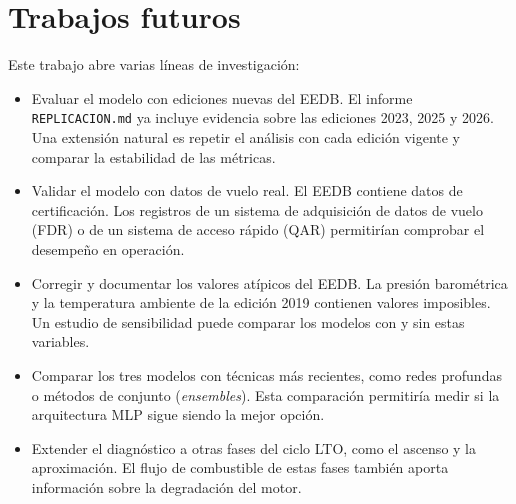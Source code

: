 \chapter{Trabajos futuros}

Este trabajo abre varias líneas de investigación:

\begin{itemize}
    \item Evaluar el modelo con ediciones nuevas del EEDB. El informe \texttt{REPLICACION.md} ya incluye evidencia sobre las ediciones 2023, 2025 y 2026. Una extensión natural es repetir el análisis con cada edición vigente y comparar la estabilidad de las métricas.
    \item Validar el modelo con datos de vuelo real. El EEDB contiene datos de certificación. Los registros de un sistema de adquisición de datos de vuelo (FDR) o de un sistema de acceso rápido (QAR) permitirían comprobar el desempeño en operación.
    \item Corregir y documentar los valores atípicos del EEDB. La presión barométrica y la temperatura ambiente de la edición 2019 contienen valores imposibles. Un estudio de sensibilidad puede comparar los modelos con y sin estas variables.
    \item Comparar los tres modelos con técnicas más recientes, como redes profundas o métodos de conjunto (\textit{ensembles}). Esta comparación permitiría medir si la arquitectura MLP sigue siendo la mejor opción.
    \item Extender el diagnóstico a otras fases del ciclo LTO, como el ascenso y la aproximación. El flujo de combustible de estas fases también aporta información sobre la degradación del motor.
\end{itemize}
